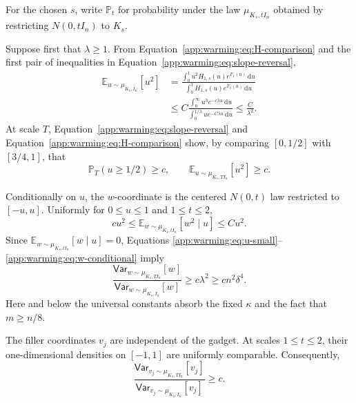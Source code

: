 \documentclass[11pt]{article}
\numberwithin{equation}{section}
\theoremstyle{definition}
\newcommand{\E}[2]{\mathbb{E}_{#1}\left[#2\right]}
\newcommand{\V}[2]{\mathsf{Var}_{#1}\left[#2\right]}
\begin{document}
For the chosen $s$, write
$\mathbb P_t$ for probability under the law
$\mu_{K_s,tI_n}$ obtained by restricting
$N(0,tI_n)$ to
$K_s$.

Suppose first that $\lambda\geq1$.
From Equation~\eqref{app:warming:eq:H-comparison} and the first pair of
inequalities in Equation~\eqref{app:warming:eq:slope-reversal},
\begin{equation}
  \begin{aligned}
    \E{u\sim\mu_{K_s,I_n}}{u^2}
    &=\frac{\displaystyle
       \int_0^1 u^2H_{1,s}(u)e^{F_1(u)}\,\mathrm du}
      {\displaystyle
       \int_0^1 H_{1,s}(u)e^{F_1(u)}\,\mathrm du}\\
    &\leq C
      \frac{\displaystyle\int_0^\infty u^3e^{-c\lambda u}\,\mathrm du}
           {\displaystyle\int_0^{1/\lambda}ue^{-C\lambda u}\,\mathrm du}
     \leq\frac{C}{\lambda^2}.
  \end{aligned}
  \label{app:warming:eq:u-small}
\end{equation}
At scale $T$, Equation~\eqref{app:warming:eq:slope-reversal} and
Equation~\eqref{app:warming:eq:H-comparison} show, by comparing
$[0,1/2]$ with
$[3/4,1]$, that
\begin{equation}
\mathbb P_T(u\geq1/2)\geq c,
\qquad
\E{u\sim\mu_{K_s,TI_n}}{u^2}\geq c.
\label{app:warming:eq:u-large}
\end{equation}

Conditionally on $u$, the
$w$-coordinate is the centered
$N(0,t)$ law restricted to
$[-u,u]$.
Uniformly for $0\leq u\leq1$ and
$1\leq t\leq2$,
\begin{equation}
cu^2
\leq\E{w\sim\mu_{K_s,tI_n}}{w^2\mid u}
\leq Cu^2.
\label{app:warming:eq:w-conditional}
\end{equation}
Since $\E{w\sim\mu_{K_s,tI_n}}{w\mid u}=0$, Equations
\eqref{app:warming:eq:u-small}--\eqref{app:warming:eq:w-conditional} imply
\begin{equation}
\frac{\V{w\sim\mu_{K_s,TI_n}}{w}}{\V{w\sim\mu_{K_s,I_n}}{w}}
\geq c\lambda^2
\geq cn^2\delta^4.
\label{app:warming:eq:w-variance-ratio}
\end{equation}
Here and below the universal constants absorb the fixed $\kappa$ and the fact
that
$m\geq n/8$.

The filler coordinates $v_j$ are independent of the gadget.
At scales $1\leq t\leq2$, their one-dimensional densities on
$[-1,1]$ are uniformly comparable.
Consequently,
\begin{equation}
  \frac{\V{v_j\sim\mu_{K_s,TI_n}}{v_j}}{\V{v_j\sim\mu_{K_s,I_n}}{v_j}}\geq c.
  \label{app:warming:eq:v-variance-ratio}
\end{equation}
\end{document}
